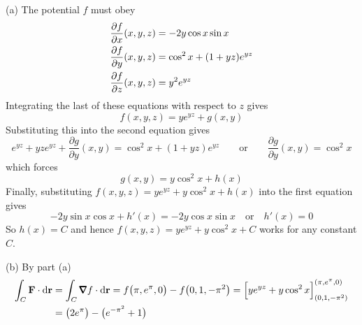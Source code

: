 \begin{solution} (a)
The potential $f$ must obey
\begin{align*}
\pdiff{f}{x}(x,y,z) 
            &= -2y \cos x \sin x \\
\pdiff{f}{y}(x,y,z) &= \cos^2 x + (1 + yz) e^{yz} \\
\pdiff{f}{z}(x,y,z) &= y^2 e^{yz}
\end{align*}
Integrating the last of these equations with respect to $z$ gives
\begin{equation*}
f(x,y,z) = ye^{yz} +g(x,y)
\end{equation*}
Substituting this into the second equation gives 
\begin{equation*}
e^{yz} + yze^{yz} +\frac{\partial g}{\partial y}(x,y) = \cos^2 x + (1 + yz) e^{yz}
\qquad\text{or}\qquad
\frac{\partial g}{\partial y}(x,y)=\cos^2 x
\end{equation*}
which forces
\begin{equation*}
g(x,y) =  y\cos^2 x + h(x)
\end{equation*}
Finally, substituting $f(x,y,z) = ye^{yz} + y\cos^2 x + h(x)$
into the first equation gives
\begin{equation*}
-2y\sin x\cos x + h'(x)
=-2y \cos x \sin x \quad\text{or}\quad
h'(x) = 0
\end{equation*}
So $h(x) = C$ and hence $f(x,y,z) =  ye^{yz} + y\cos^2 x + C$  
works for any constant $C$.



(b) By part (a)
\begin{align*}
\int_C \vF \cdot \dee{\vr}
&= \int_C \vnabla f \cdot \dee{\vr}
=f\big(\pi, e^\pi , 0\big) -f\big(0, 1, -\pi^2\big)
=\Big[ye^{yz} + y\cos^2 x\Big]^{(\pi, e^\pi , 0)}_{(0, 1, -\pi^2 )} \\
&=\big(2e^\pi\big)-\big(e^{-\pi^2}+1\big)
\end{align*}

\end{solution}



